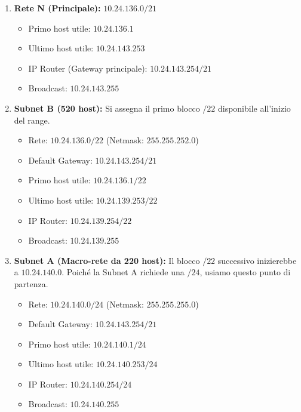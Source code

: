 \documentclass[11pt,a4paper]{report}
\begin{document}
\begin{enumerate}
  \item \textbf{Rete N (Principale):} $10.24.136.0/21$
  \begin{itemize}
    \item Primo host utile: $10.24.136.1$
    \item Ultimo host utile: $10.24.143.253$
    \item IP Router (Gateway principale): $10.24.143.254/21$
    \item Broadcast: $10.24.143.255$
  \end{itemize}
  
  \item \textbf{Subnet B (520 host):} Si assegna il primo blocco $/22$ disponibile all'inizio del range.
  \begin{itemize}
    \item Rete: $10.24.136.0/22$ (Netmask: $255.255.252.0$)
    \item Default Gateway: $10.24.143.254/21$
    \item Primo host utile: $10.24.136.1/22$
    \item Ultimo host utile: $10.24.139.253/22$
    \item IP Router: $10.24.139.254/22$
    \item Broadcast: $10.24.139.255$
  \end{itemize}

  \item \textbf{Subnet A (Macro-rete da 220 host):} Il blocco $/22$ successivo inizierebbe a $10.24.140.0$. Poiché la Subnet A richiede una $/24$, usiamo questo punto di partenza.
  \begin{itemize}
    \item Rete: $10.24.140.0/24$ (Netmask: $255.255.255.0$)
    \item Default Gateway: $10.24.143.254/21$
    \item Primo host utile: $10.24.140.1/24$
    \item Ultimo host utile: $10.24.140.253/24$
    \item IP Router: $10.24.140.254/24$
    \item Broadcast: $10.24.140.255$
  \end{itemize}


\end{enumerate}
\end{document}
